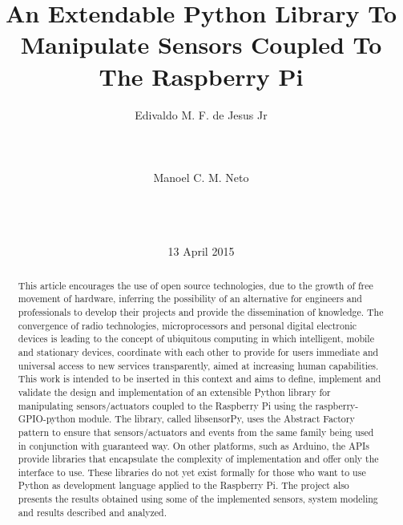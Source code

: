\documentclass{acm_proc_article-sp}
\begin{document}
\thispagestyle{empty}

\title{An Extendable Python Library To Manipulate Sensors Coupled To The Raspberry Pi}

\author{
\alignauthor
Edivaldo M. F. de Jesus Jr\\
       \\
       \\
       \\
\alignauthor
Manoel C. M. Neto\\
       \\
       \\
       \\
}

\date{13 April 2015}

\maketitle
\begin{abstract}

This article encourages the use of open source technologies, due to the growth of free movement of hardware, inferring the possibility of an alternative for engineers and professionals to develop their projects and provide the dissemination of knowledge.
The convergence of radio technologies, microprocessors and personal digital electronic devices is leading to the concept of ubiquitous computing in which intelligent, mobile and stationary devices, coordinate with each other to provide for users immediate and universal access to new services transparently, aimed at increasing human capabilities. This work is intended to be inserted in this context and aims to define, implement and validate the design and implementation of an extensible Python library for manipulating sensors/actuators coupled to the Raspberry Pi using the raspberry-GPIO-python module. The library, called libsensorPy, uses the Abstract Factory pattern to ensure that sensors/actuators and events from the same family being used in conjunction with guaranteed way. On other platforms, such as Arduino, the APIs provide libraries that encapsulate the complexity of implementation and offer only the interface to use. These libraries do not yet exist formally for those who want to use Python as development language applied to the Raspberry Pi.  The project also presents the results obtained using some of the implemented sensors, system modeling and results described and analyzed.

\end{abstract}
\end{document}
